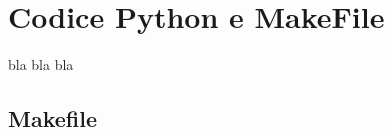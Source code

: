 \begin{appendices}
\label{appendix}
\chapter{Codice Python e MakeFile}
bla bla bla

    \section{Makefile}
    \label{appendix:makefile}
	

\end{appendices}
